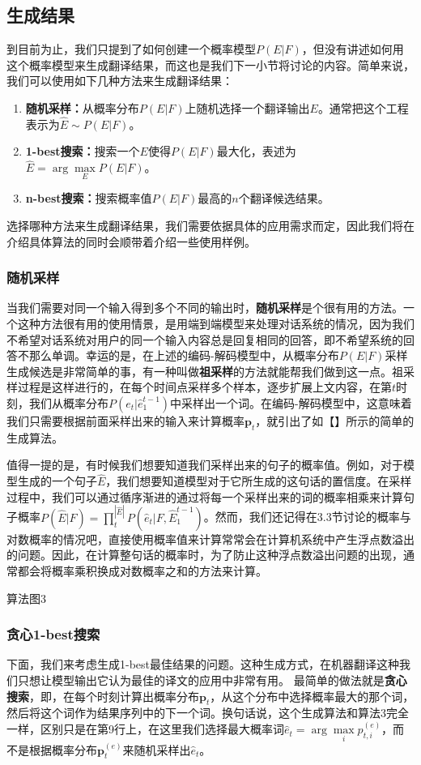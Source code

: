 \documentclass[10pt,a4paper]{ctexart}
\begin{document}
\subsection{生成结果}
到目前为止，我们只提到了如何创建一个概率模型$P(E|F)$，但没有讲述如何用这个概率模型来生成翻译结果，而这也是我们下一小节将讨论的内容。简单来说，我们可以使用如下几种方法来生成翻译结果：
\begin{enumerate}
\item[] \textbf{随机采样：}从概率分布$P(E|F)$上随机选择一个翻译输出$E$。通常把这个工程表示为$\hat{E} \sim P(E|F)$。
\item[] \textbf{1-best搜索：}搜索一个$E$使得$P(E|F)$最大化，表述为$\hat{E} = \arg\max \limits_{E} P(E|F)$。
\item[] \textbf{n-best搜索：}搜索概率值$P(E|F)$最高的$n$个翻译候选结果。
\end{enumerate}
选择哪种方法来生成翻译结果，我们需要依据具体的应用需求而定，因此我们将在介绍具体算法的同时会顺带着介绍一些使用样例。

\subsubsection{随机采样}
当我们需要对同一个输入得到多个不同的输出时，\textbf{随机采样}是个很有用的方法。一个这种方法很有用的使用情景，是用端到端模型来处理对话系统的情况，因为我们不希望对话系统对用户的同一个输入内容总是回复相同的回答，即不希望系统的回答不那么单调。幸运的是，在上述的编码-解码模型中，从概率分布$P(E|F)$采样生成候选是非常简单的事，有一种叫做\textbf{祖采样}的方法就能帮我们做到这一点。祖采样过程是这样进行的，在每个时间点采样多个样本，逐步扩展上文内容，在第$t$时刻，我们从概率分布$P(e_t | \hat{e}_1^{t-1})$中采样出一个词。在编码-解码模型中，这意味着我们只需要根据前面采样出来的输入来计算概率$\textbf{p}_t$，就引出了如【】所示的简单的生成算法。

值得一提的是，有时候我们想要知道我们采样出来的句子的概率值。例如，对于模型生成的一个句子$\hat{E}$，我们想要知道模型对于它所生成的这句话的置信度。在采样过程中，我们可以通过循序渐进的通过将每一个采样出来的词的概率相乘来计算句子概率$P(\hat{E}|F) = \prod_{t}^{|\hat{E}|}P(\hat{e}_t|F,\hat{E}_1^{t-1})$。然而，我们还记得在3.3节讨论的概率与对数概率的情况吧，直接使用概率值来计算常常会在计算机系统中产生浮点数溢出的问题。因此，在计算整句话的概率时，为了防止这种浮点数溢出问题的出现，通常都会将概率乘积换成对数概率之和的方法来计算。

算法图3

\subsubsection{贪心1-best搜索}
下面，我们来考虑生成1-best最佳结果的问题。这种生成方式，在机器翻译这种我们只想让模型输出它认为最佳的译文的应用中非常有用。
最简单的做法就是\textbf{贪心搜索}，即，在每个时刻计算出概率分布$\textbf{p}_t$，从这个分布中选择概率最大的那个词，然后将这个词作为结果序列中的下一个词。换句话说，这个生成算法和算法3完全一样，区别只是在第9行上，在这里我们选择最大概率词$\hat{e}_t = \arg \max \limits_{i} p_{t,i}^{(e)}$，而不是根据概率分布$\textbf{p}_t^{(e)}$来随机采样出$\hat{e}_t$。
\end{document}
